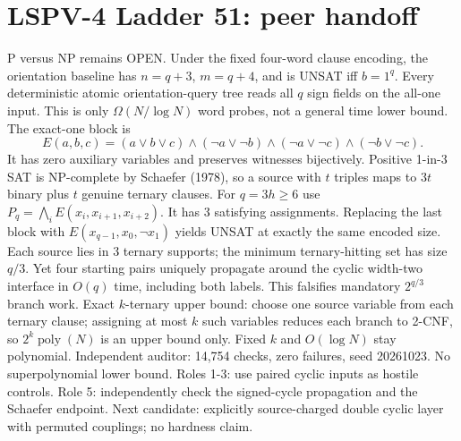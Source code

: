 \documentclass{article}
\begin{document}
\section*{LSPV-4 Ladder 51: peer handoff}
P versus NP remains OPEN. Under the fixed four-word clause encoding, the orientation baseline has $n=q+3$, $m=q+4$, and is UNSAT iff $b=1^q$. Every deterministic atomic orientation-query tree reads all $q$ sign fields on the all-one input. This is only $\Omega(N/\log N)$ word probes, not a general time lower bound.
The exact-one block is
\[
E(a,b,c)=(a\vee b\vee c)\land(\neg a\vee\neg b)\land(\neg a\vee\neg c)\land(\neg b\vee\neg c).
\]
It has zero auxiliary variables and preserves witnesses bijectively. Positive 1-in-3 SAT is NP-complete by Schaefer (1978), so a source with $t$ triples maps to $3t$ binary plus $t$ genuine ternary clauses.
For $q=3h\ge6$ use $P_q=\bigwedge_i E(x_i,x_{i+1},x_{i+2})$. It has 3 satisfying assignments. Replacing the last block with $E(x_{q-1},x_0,\neg x_1)$ yields UNSAT at exactly the same encoded size. Each source lies in 3 ternary supports; the minimum ternary-hitting set has size $q/3$. Yet four starting pairs uniquely propagate around the cyclic width-two interface in $O(q)$ time, including both labels. This falsifies mandatory $2^{q/3}$ branch work.
Exact $k$-ternary upper bound: choose one source variable from each ternary clause; assigning at most $k$ such variables reduces each branch to 2-CNF, so $2^k\operatorname{poly}(N)$ is an upper bound only. Fixed $k$ and $O(\log N)$ stay polynomial.
Independent auditor: 14,754 checks, zero failures, seed 20261023. No superpolynomial lower bound. Roles 1-3: use paired cyclic inputs as hostile controls. Role 5: independently check the signed-cycle propagation and the Schaefer endpoint. Next candidate: explicitly source-charged double cyclic layer with permuted couplings; no hardness claim.
\end{document}
